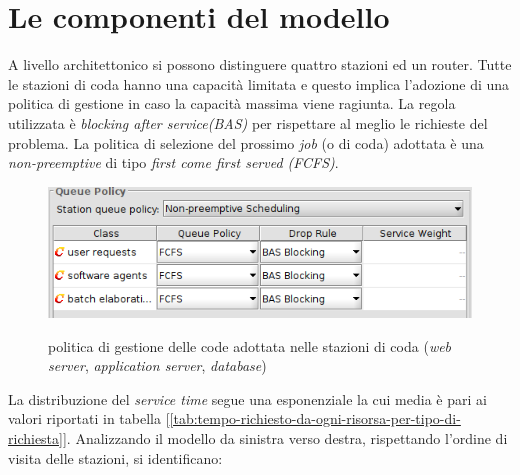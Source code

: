 \documentclass[../main.tex]{subfiles}
\begin{document}
    \section{Le componenti del modello}\label{sec:le-componenti-del-modello}
    A livello architettonico si possono distinguere quattro stazioni ed un router.
    Tutte le stazioni di coda hanno una capacità limitata e questo implica l'adozione di una politica di gestione in caso la capacità massima viene ragiunta.
    La regola utilizzata è \textit{blocking after service(BAS)} per rispettare al meglio le richieste del problema.
    La politica di selezione del prossimo \textit{job} (o di coda) adottata è una  \textit{non-preemptive} di tipo \textit{first come first served (FCFS)}.
    \begin{figure}[H]
        \centering
        \includegraphics[scale = 0.5]{assets/queue_policy.png}\\
        \caption[\textit{Politica} di gestione delle code]{ politica di gestione delle code adottata nelle stazioni di coda (\textit{web server}, \textit{application server}, \textit{database})}
        \label{fig:politica-di-coda}
    \end{figure}
    La distribuzione del \textit{service time} segue una esponenziale la cui media è pari ai valori riportati in tabella [\ref{tab:tempo-richiesto-da-ogni-risorsa-per-tipo-di-richiesta}].
    Analizzando il modello da sinistra verso destra, rispettando l'ordine di visita delle stazioni, si identificano:
\end{document}
